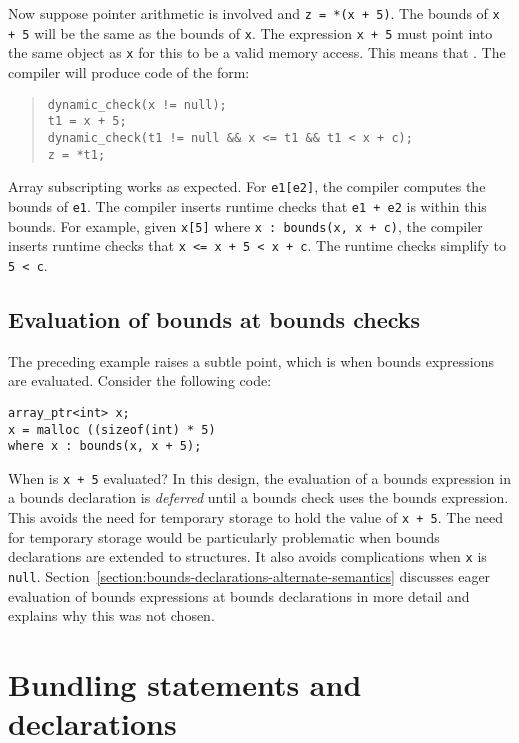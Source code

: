 Now suppose pointer arithmetic is involved and \texttt{z = *(x + 5)}. The
bounds of \texttt{x + 5} will be the same as the bounds of \texttt{x}.
The expression \texttt{x + 5} must point into the same object as
\texttt{x} for this to be a valid memory access. This means that
.
The compiler will produce code of the form:

\begin{quote}
\begin{verbatim}
dynamic_check(x != null);
t1 = x + 5;
dynamic_check(t1 != null && x <= t1 && t1 < x + c);
z = *t1;
\end{verbatim}
\end{quote}

Array subscripting works as expected. For \texttt{e1[e2]}, the
compiler computes the bounds of \texttt{e1}. The compiler inserts
runtime checks that \texttt{e1 + e2} is within this bounds. For example,
given \verb|x[5]| where \verb|x : bounds(x, x + c)|, the
compiler inserts runtime checks that \verb|x <= x + 5 < x + c|. 
The runtime checks simplify to \verb|5 < c|.

\subsection{Evaluation of bounds at bounds checks}

The preceding example raises a subtle point, which is when bounds
expressions are evaluated. Consider the following code:

\begin{verbatim}
array_ptr<int> x;
x = malloc ((sizeof(int) * 5)
where x : bounds(x, x + 5);
\end{verbatim}

When is \texttt{x + 5} evaluated?  In this design, 
the evaluation of a bounds expression in a bounds declaration is
{\em deferred} until a bounds check uses the bounds expression. 
This avoids the need for temporary storage to 
hold the value of \texttt{x + 5}.  The need for temporary storage would
be particularly problematic when bounds declarations are extended
to structures.   It also avoids complications when \texttt{x} is
\texttt{null}. Section~\ref{section:bounds-declarations-alternate-semantics} 
discusses eager evaluation of bounds expressions at
bounds declarations in more detail and explains why this was not chosen.

\section{Bundling statements and declarations}

